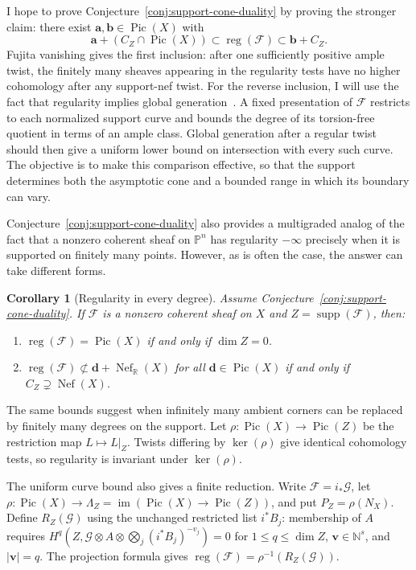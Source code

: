 \documentclass[11pt,reqno]{amsart}
\newtheorem{cor}[lemma]{Corollary}
\theoremstyle{remark}
\newcommand{\reg}{\operatorname{reg}}
\newcommand{\im}{\operatorname{im}}
\newcommand{\Pic}{\operatorname{Pic}}
\newcommand{\supp}{\operatorname{supp}}
\newcommand{\Nef}{\operatorname{Nef}}
\renewcommand{\aa}{\mathbf{a}}
\newcommand{\bb}{\mathbf{b}}
\newcommand{\dd}{\mathbf{d}}
\newcommand{\vv}{\mathbf{v}}
\newcommand{\NN}{\mathbb{N}}
\newcommand{\PP}{\mathbb{P}}
\newcommand{\RR}{\mathbb{R}}
\newcommand{\cF}{\mathcal{F}}
\newcommand{\cG}{\mathcal{G}}
\begin{document}
I hope to prove Conjecture~\ref{conj:support-cone-duality} by proving the stronger claim: there exist $\aa,\bb\in\Pic(X)$ with
\begin{equation}\label{eq:support-bounds}
\aa+(C_Z\cap\Pic(X))\subset \reg(\cF)\subset \bb+C_Z.
\end{equation}
Fujita vanishing gives the first inclusion: after one sufficiently positive ample twist, the finitely many sheaves appearing in the regularity tests have no higher cohomology after any support-nef twist. For the reverse inclusion, I will use the fact that regularity implies global generation~\cite{maclaganSmith04}. A fixed presentation of $\cF$ restricts to each normalized support curve and bounds the degree of its torsion-free quotient in terms of an ample class. Global generation after a regular twist should then give a uniform lower bound on intersection with every such curve. The objective is to make this comparison effective, so that the support determines both the asymptotic cone and a bounded range in which its boundary can vary.

Conjecture~\ref{conj:support-cone-duality} also provides a multigraded analog of the fact that a nonzero coherent sheaf on $\PP^n$ has regularity $-\infty$ precisely when it is supported on finitely many points. However, as is often the case, the answer can take different forms. 

\begin{cor}[Regularity in every degree]\label{cor:regularity-minus-infinity}
Assume Conjecture~\ref{conj:support-cone-duality}. If $\cF$ is a nonzero coherent sheaf on $X$ and $Z=\supp(\cF)$, then:
\begin{enumerate}
\item $\reg(\cF)=\Pic(X)$ if and only if $\dim Z=0$.
\item $\reg(\cF) \not\subset \dd +\Nef_{\RR}(X)$ for all $\dd \in \Pic(X)$ if and only if $C_Z \supsetneq\Nef(X)$.
\end{enumerate}
\end{cor}

The same bounds suggest when infinitely many ambient corners can be replaced by finitely many degrees on the support. Let $\rho:\Pic(X)\to\Pic(Z)$ be the restriction map $L\mapsto L|_{Z}$. Twists differing by $\ker(\rho)$ give identical cohomology tests, so regularity is invariant under $\ker(\rho)$.


The uniform curve bound also gives a finite reduction. Write $\cF=i_*\cG$, let $\rho:\Pic(X)\to\Lambda_Z=\im(\Pic(X)\to\Pic(Z))$, and put $P_Z=\rho(N_X)$. Define $R_Z(\cG)$ using the unchanged restricted list $i^*B_j$: membership of $A$ requires $H^q(Z,\cG\otimes A\otimes\bigotimes_j(i^*B_j)^{-v_j})=0$ for $1\leq q\leq\dim Z$, $\vv\in\NN^s$, and $|\vv|=q$. The projection formula gives $\reg(\cF)=\rho^{-1}(R_Z(\cG))$.
\end{document}
